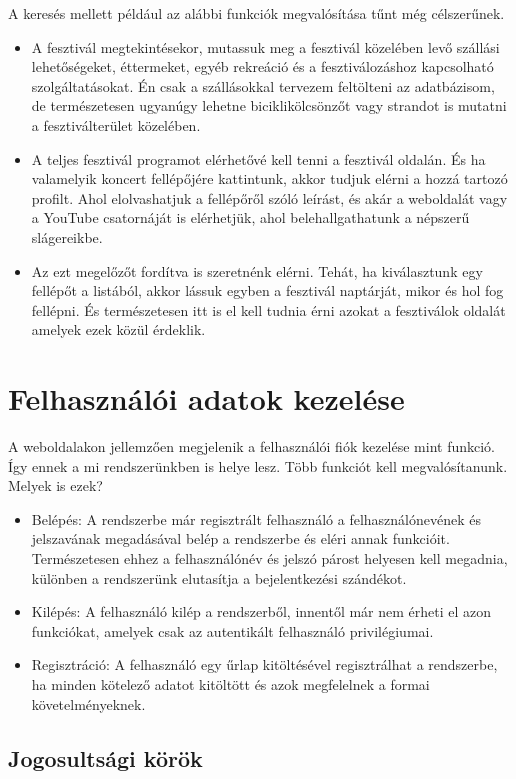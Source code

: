A keresés mellett például az alábbi funkciók megvalósítása tűnt még célszerűnek.
\begin{itemize}
\item A fesztivál megtekintésekor, mutassuk meg a fesztivál közelében levő szállási lehetőségeket, éttermeket, egyéb rekreáció és a fesztiválozáshoz kapcsolható szolgáltatásokat. Én csak a szállásokkal tervezem feltölteni az adatbázisom, de természetesen ugyanúgy lehetne biciklikölcsönzőt vagy strandot is mutatni a fesztiválterület közelében.
\item A teljes fesztivál programot elérhetővé kell tenni a fesztivál oldalán. És ha valamelyik koncert fellépőjére kattintunk, akkor tudjuk elérni a hozzá tartozó profilt. Ahol elolvashatjuk a fellépőről szóló leírást, és akár a weboldalát vagy a YouTube csatornáját is elérhetjük, ahol belehallgathatunk a népszerű slágereikbe.
\item Az ezt megelőzőt fordítva is szeretnénk elérni. Tehát, ha kiválasztunk egy fellépőt a listából, akkor lássuk egyben a fesztivál naptárját, mikor és hol fog fellépni. És természetesen itt is el kell tudnia érni azokat a fesztiválok oldalát amelyek ezek közül érdeklik.
\end{itemize}

\section{Felhasználói adatok kezelése}

A weboldalakon jellemzően megjelenik a felhasználói fiók kezelése mint funkció. Így ennek a mi rendszerünkben is helye lesz.
Több funkciót kell megvalósítanunk. Melyek is ezek?
\begin{itemize}
\item Belépés: A rendszerbe már regisztrált felhasználó a felhasználónevének és jelszavának megadásával belép a rendszerbe és eléri annak funkcióit. Természetesen ehhez a felhasználónév és jelszó párost helyesen kell megadnia, különben a rendszerünk elutasítja a bejelentkezési szándékot.
\item Kilépés: A felhasználó kilép a rendszerből, innentől már nem érheti el azon funkciókat, amelyek csak az autentikált felhasználó privilégiumai.
\item Regisztráció: A felhasználó egy űrlap kitöltésével regisztrálhat a rendszerbe, ha minden kötelező adatot kitöltött és azok megfelelnek a formai követelményeknek.
\end{itemize}

\subsection{Jogosultsági körök}

